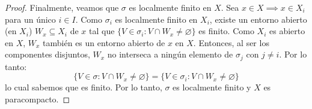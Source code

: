 \documentclass{article}
\theoremstyle{plain}
\theoremstyle{definition}
\begin{document}
\begin{proof}
    Finalmente, veamos que \( \sigma \) es localmente finito en \( X \).
    Sea \( x \in X \implies x \in X_i \) para un único \( i \in I \). Como \( \sigma_i \) es localmente finito en \( X_i \), existe un entorno abierto (en \( X_i \)) \( W_x \subseteq X_i \) de \( x \) tal que \( \{ V \in \sigma_i : V \cap W_x \neq \varnothing \} \) es finito.
    Como \( X_i \) es abierto en \( X \), \( W_x \) también es un entorno abierto de \( x \) en \( X \).
    Entonces, al ser los componentes disjuntos, \( W_x \) no interseca a ningún elemento de \( \sigma_j \) con \( j \neq i \). Por lo tanto: \[
        \{ V \in \sigma : V \cap W_x \neq \varnothing \} = \{ V \in \sigma_i : V \cap W_x \neq \varnothing \}
    \]
    lo cual sabemos que es finito. Por lo tanto, \( \sigma \) es localmente finito y \( X \) es paracompacto.
\end{proof}
\end{document}
